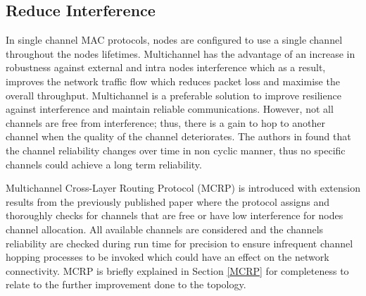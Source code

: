 \subsection{Reduce Interference}
In single channel MAC protocols, nodes are configured to use a single channel throughout the nodes lifetimes. Multichannel has the advantage of an increase in robustness against external and intra nodes interference which as a result, improves the network traffic flow which reduces packet loss and maximise the overall throughput.
Multichannel is a preferable solution to improve resilience against interference and maintain reliable communications. However, not all channels are free from interference; thus, there is a gain to hop to another channel when the quality of the channel deteriorates. 
The authors in \cite{homearea} found that the channel reliability changes over time in non cyclic manner, thus no specific channels could achieve a long term reliability. 

Multichannel Cross-Layer Routing Protocol (MCRP) \cite{mcrp} is introduced with extension results from the previously published paper where the protocol assigns and thoroughly checks for channels that are free or have low interference for nodes channel allocation. All available channels are considered and the channels reliability are checked during run time for precision to ensure infrequent channel hopping processes to be invoked which could have an effect on the network connectivity. MCRP is briefly explained in Section \ref{MCRP} for completeness to relate to the further improvement done to the topology.


